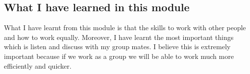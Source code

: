 

\subsection{What I have learned in this module}
What I have learnt from this module is that the skills to work with other people and how to work equally. Moreover, I have learnt the most important things which is listen and discuss with my group mates. I believe this is extremely important because if we work as a group we will be able to work much more efficiently and quicker.

